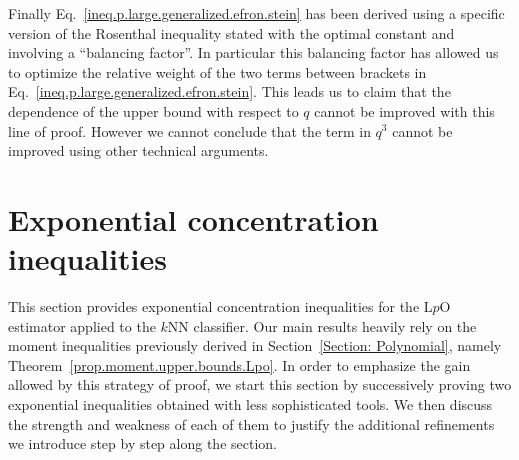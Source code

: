 \documentclass[twoside,11pt]{article}
\numberwithin{equation}{section}
\newcommand{\1}{\mathds{1}}%
\numberwithin{equation}{section}
\theoremstyle{plain}
\begin{document}
Finally Eq.~\eqref{ineq.p.large.generalized.efron.stein} has been derived using a specific version of the Rosenthal inequality \citep{IbragShar2002} stated with the optimal constant and involving a ``balancing factor''.
%
In particular this balancing factor has allowed us to optimize the relative weight of the two terms between brackets in Eq.~\eqref{ineq.p.large.generalized.efron.stein}.
This leads us to claim that the dependence of the upper bound with respect to $q$ cannot be improved with this line of proof.
%
However we cannot conclude that the term in $q^3$ cannot be improved using other technical arguments.














\section{Exponential concentration inequalities} \label{Section: Deviations}

This section provides exponential concentration inequalities for the L$p$O estimator applied to the $k$NN classifier.
%
Our main results heavily rely on the moment inequalities previously derived in Section~\ref{Section: Polynomial}, namely Theorem~\ref{prop.moment.upper.bounds.Lpo}.
%
In order to emphasize the gain allowed by this strategy of proof, we start this section by successively proving two exponential inequalities obtained with less sophisticated tools.
%
We then discuss the strength and weakness of each of them to justify the additional refinements we introduce step by step along the section.
\end{document}
